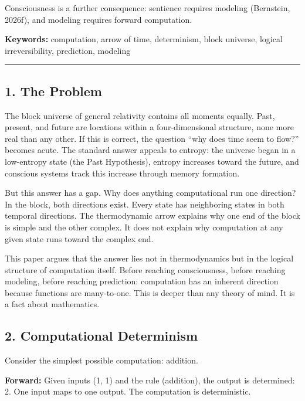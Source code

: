 \documentclass[
]{article}
\begin{document}
Consciousness is a further consequence: sentience requires modeling
(Bernstein, 2026f), and modeling requires forward computation.

\textbf{Keywords:} computation, arrow of time, determinism, block
universe, logical irreversibility, prediction, modeling

\begin{center}\rule{0.5\linewidth}{0.5pt}\end{center}

\subsection{1. The Problem}\label{the-problem}

The block universe of general relativity contains all moments equally.
Past, present, and future are locations within a four-dimensional
structure, none more real than any other. If this is correct, the
question ``why does time seem to flow?'' becomes acute. The standard
answer appeals to entropy: the universe began in a low-entropy state
(the Past Hypothesis), entropy increases toward the future, and
conscious systems track this increase through memory formation.

But this answer has a gap. Why does anything computational run one
direction? In the block, both directions exist. Every state has
neighboring states in both temporal directions. The thermodynamic arrow
explains why one end of the block is simple and the other complex. It
does not explain why computation at any given state runs toward the
complex end.

This paper argues that the answer lies not in thermodynamics but in the
logical structure of computation itself. Before reaching consciousness,
before reaching modeling, before reaching prediction: computation has an
inherent direction because functions are many-to-one. This is deeper
than any theory of mind. It is a fact about mathematics.

\subsection{2. Computational
Determinism}\label{computational-determinism}

Consider the simplest possible computation: addition.

\textbf{Forward:} Given inputs (1, 1) and the rule (addition), the
output is determined: 2. One input maps to one output. The computation
is deterministic.
\end{document}
